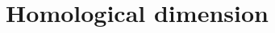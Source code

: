 \documentclass{ximera}
\title{Homological dimension}
\begin{document}
\begin{abstract}

\end{abstract}
\maketitle

\end{document}

